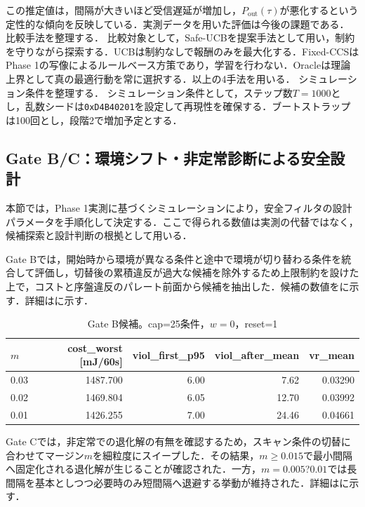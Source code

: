 この推定値は，間隔が大きいほど受信遅延が増加し，$P_{\mathrm{out}}(\tau)$が悪化するという定性的な傾向を反映している．実測データを用いた評価は今後の課題である．
比較手法を整理する．
比較対象として，Safe-UCBを提案手法として用い，制約を守りながら探索する．UCBは制約なしで報酬のみを最大化する．Fixed-CCSはPhase 1の写像によるルールベース方策であり，学習を行わない．Oracleは理論上界として真の最適行動を常に選択する．以上の4手法を用いる．
シミュレーション条件を整理する．
シミュレーション条件として，ステップ数$T = 1000$とし，乱数シードは\texttt{0xD4B40201}を設定して再現性を確保する．ブートストラップは100回とし，段階2で増加予定とする．

\subsection{Gate B/C：環境シフト・非定常診断による安全設計}
\label{sec:phase2_gatebc}
本節では，Phase 1実測に基づくシミュレーションにより，安全フィルタの設計パラメータを手順化して決定する．ここで得られる数値は実測の代替ではなく，候補探索と設計判断の根拠として用いる．

Gate Bでは，開始時から環境が異なる条件と途中で環境が切り替わる条件を統合して評価し，切替後の累積違反が過大な候補を除外するため上限制約を設けた上で，コストと序盤違反のパレート前面から候補を抽出した．候補の数値をに示す．詳細は\texttt{}に示す．

\begin{table}[tb]
  \centering
  \caption{Gate B候補。cap=25条件，$w=0$，reset=1}
  \label{tab:gateb_candidates}
  {\scriptsize
  \begin{tabular}{lrrrr}
    \toprule
    $m$ & cost\_worst [mJ/60s] & viol\_first\_p95 & viol\_after\_mean & vr\_mean \\
    \midrule
    0.03 & 1487.700 & 6.00 & 7.62 & 0.03290 \\
    0.02 & 1469.804 & 6.05 & 12.70 & 0.03992 \\
    0.01 & 1426.255 & 7.00 & 24.46 & 0.04661 \\
    \bottomrule
  \end{tabular}
  }
\end{table}

Gate Cでは，非定常での退化解の有無を確認するため，スキャン条件の切替に合わせてマージン$m$を細粒度にスイープした．その結果，$m\ge 0.015$で最小間隔へ固定化される退化解が生じることが確認された．一方，$m=0.005$?$0.01$では長間隔を基本としつつ必要時のみ短間隔へ退避する挙動が維持された．詳細は\texttt{}に示す．

